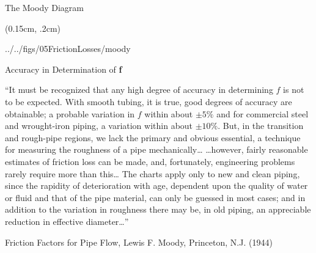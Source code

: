 \documentclass[9pt,xcolor={svgnames, x11names},professionalfonts, mathserif]{beamer}
\begin{document}

     \begin{frame}{The Moody Diagram}
      \begin{textblock*}{1\columnwidth}(0.15cm, .2cm)
       \begin{cfig}[0.6]{../../figs/05FrictionLosses/moody}\end{cfig}
      \end{textblock*}
     \end{frame}

     \begin{frame}{Accuracy in Determination of \textbf{f}}

      \begin{cmini}{
        ``It must be recognized that any high degree of accuracy in determining $f$ is not to be expected. With smooth tubing, it is true,
        good degrees of accuracy are obtainable; a probable variation in $f$ within about $\pm5\%$ and for commercial
        steel and wrought-iron piping, a variation within about $\pm10\%$. But, in the transition and rough-pipe regions, we lack the primary and obvious essential, a technique for measuring the roughness of a pipe mechanically\ldots
        \parm
        \ldots however, fairly reasonable estimates of friction loss can be made, and, fortunately, engineering problems rarely require more than this\ldots
        \parm
        The charts apply only to new and clean piping, since the rapidity of deterioration with age, dependent upon the quality of water or fluid and that
        of the pipe material, can only be guessed in most cases; and in addition to the variation in roughness there may be, in old piping, an appreciable reduction in effective
        diameter\ldots''
        }\end{cmini}

       \hfill{\footnotesize{Friction Factors for Pipe Flow, Lewis F. Moody, Princeton, N.J. (1944)}}
       \end{frame}
\end{document}

